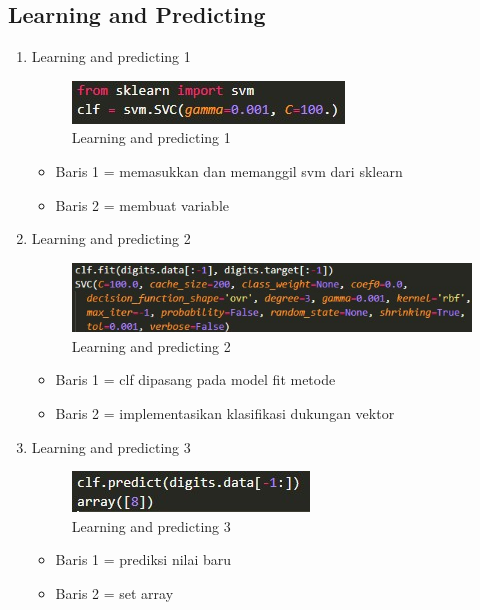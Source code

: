 \subsection{Learning and Predicting}
\begin{enumerate}
	\item Learning and predicting 1
			\begin{figure}[ht]
			\centering
			\includegraphics[scale=0.5]{figures/b1.jpg}
			\caption{Learning and predicting 1}
			\label{contoh}
			\end{figure}
			\begin{itemize}
			    \item Baris 1 = memasukkan dan memanggil svm dari sklearn
			    \item Baris 2 = membuat variable
			\end{itemize}

	\item Learning and predicting 2
		\begin{figure}[ht]
		\centering
		\includegraphics[scale=0.5]{figures/b2.jpg}
		\caption{Learning and predicting 2}
		\label{contoh}
		\end{figure}
		\begin{itemize}
			    \item Baris 1 = clf dipasang pada model fit metode
			    \item Baris 2 =  implementasikan klasifikasi dukungan vektor
			\end{itemize}
			
	\item Learning and predicting 3
		\begin{figure}[ht]
		\centering
		\includegraphics[scale=0.5]{figures/b3.jpg}
		\caption{Learning and predicting 3}
		\label{contoh}
		\end{figure}
		\begin{itemize}
			    \item Baris 1 = prediksi nilai baru
			    \item Baris 2 = set array
			\end{itemize}
\end{enumerate}

